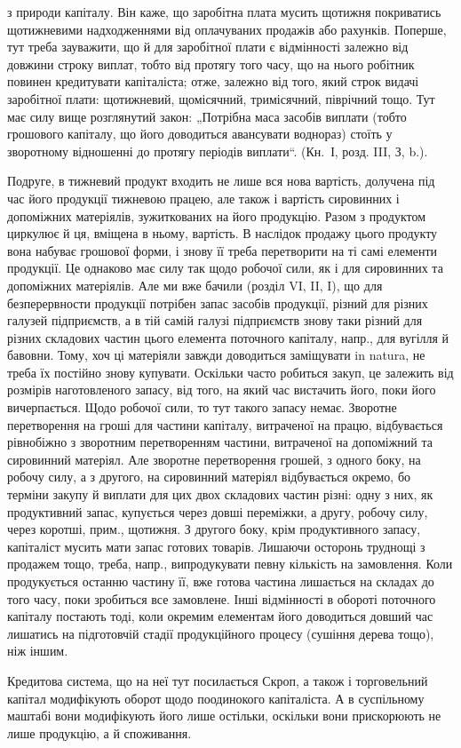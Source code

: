 \parcont{}  %
з природи капіталу. Він каже, що заробітна плата мусить щотижня покриватись
щотижневими надходженнями від оплачуваних продажів або рахунків.
Поперше, тут треба зауважити, що й для заробітної плати є
відмінності залежно від довжини строку виплат, тобто від протягу
того часу, що на нього робітник повинен кредитувати капіталіста; отже,
залежно від того, який строк видачі заробітної плати: щотижневий,
щомісячний, тримісячний, піврічний тощо. Тут має силу вище розглянутий
закон: „Потрібна маса засобів виплати (тобто грошового капіталу, що
його доводиться авансувати воднораз) стоїть у зворотному відношенні
до протягу періодів виплати“. (Кн.~І, розд. III, З, b.).

Подруге, в тижневий продукт входить не лише вся нова вартість, долучена
під час його продукції тижневою працею, але також і вартість сировинних
і допоміжних матеріялів, зужиткованих на його продукцію. Разом
з продуктом циркулює й ця, вміщена в ньому, вартість. В наслідок продажу
цього продукту вона набуває грошової форми, і знову її треба
перетворити на ті самі елементи продукції. Це однаково має силу так
щодо робочої сили, як і для сировинних та допоміжних матеріялів. Але
ми вже бачили (розділ VI, II, I), що для безперервности продукції потрібен
запас засобів продукції, різний для різних галузей підприємств,
а в тій самій галузі підприємств знову таки різний для різних складових
частин цього елемента поточного капіталу, напр., для вугілля й бавовни.
Тому, хоч ці матеріяли завжди доводиться заміщувати in natura, не треба
їх постійно знову купувати. Оскільки часто робиться закуп, це залежить
від розмірів наготовленого запасу, від того, на який час вистачить його,
поки його вичерпається. Щодо робочої сили, то тут такого запасу немає.
Зворотне перетворення на гроші для частини капіталу, витраченої на
працю, відбувається рівнобіжно з зворотним перетворенням частини, витраченої
на допоміжний та сировинний матеріял. Але зворотне перетворення
грошей, з одного боку, на робочу силу, а з другого, на сировинний
матеріял відбувається окремо, бо терміни закупу й виплати для цих двох
складових частин різні: одну з них, як продуктивний запас, купується
через довші переміжки, а другу, робочу силу, через коротші, прим.,
щотижня. З другого боку, крім продуктивного запасу, капіталіст мусить
мати запас готових товарів. Лишаючи осторонь труднощі з продажем
тощо, треба, напр., випродукувати певну кількість на замовлення. Коли
продукується останню частину її, вже готова частина лишається на складах
до того часу, поки зробиться все замовлене. Інші відмінності в обороті
поточного капіталу постають тоді, коли окремим елементам його
доводиться довший час лишатись на підготовчій стадії продукційного
процесу (сушіння дерева тощо), ніж іншим.

Кредитова система, що на неї тут посилається Скроп, а також і торговельний
капітал модифікують оборот щодо поодинокого капіталіста.
А в суспільному маштабі вони модифікують його лише остільки, оскільки
вони прискорюють не лише продукцію, а й споживання.
